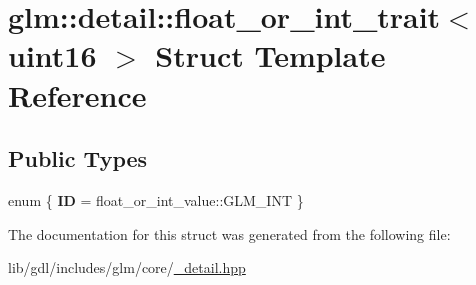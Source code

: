 \hypertarget{structglm_1_1detail_1_1float__or__int__trait_3_01uint16_01_4}{}\section{glm\+:\+:detail\+:\+:float\+\_\+or\+\_\+int\+\_\+trait$<$ uint16 $>$ Struct Template Reference}
\label{structglm_1_1detail_1_1float__or__int__trait_3_01uint16_01_4}
\subsection*{Public Types}
\begin{DoxyCompactItemize}
\item 
\hypertarget{structglm_1_1detail_1_1float__or__int__trait_3_01uint16_01_4_a139f439a888605a2c8b5c8aba8d21c18}{}enum \{ {\bfseries I\+D} = float\+\_\+or\+\_\+int\+\_\+value\+:\+:G\+L\+M\+\_\+\+I\+N\+T
 \}\label{structglm_1_1detail_1_1float__or__int__trait_3_01uint16_01_4_a139f439a888605a2c8b5c8aba8d21c18}

\end{DoxyCompactItemize}


The documentation for this struct was generated from the following file\+:\begin{DoxyCompactItemize}
\item 
lib/gdl/includes/glm/core/\hyperlink{__detail_8hpp}{\+\_\+detail.\+hpp}\end{DoxyCompactItemize}
